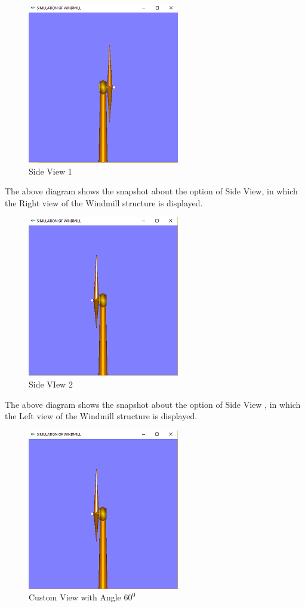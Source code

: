 \documentclass[fontsize=12pt]{article}
\begin{document}
\begin{figure}[h]
	\centering
  	\includegraphics{F3.PNG}
  	\caption{Side View 1}
  	\label{fig:Side1}
\end{figure}
The above diagram shows the snapshot about the option of Side View, in which the Right view of the Windmill structure is displayed.\\

\begin{figure}[h]
	\centering
  	\includegraphics{F4.PNG}
  	\caption{Side VIew 2}
  	\label{fig:Side2}
\end{figure}
The above diagram shows the snapshot about the option of Side View , in which the Left view of the Windmill structure is displayed.\\
\newpage

\begin{figure}[h]
	\centering
  	\includegraphics{F4.PNG}
  	\caption{Custom View with Angle $60^{0}$}
  	\label{fig:Custom}
\end{figure}
\end{document}
